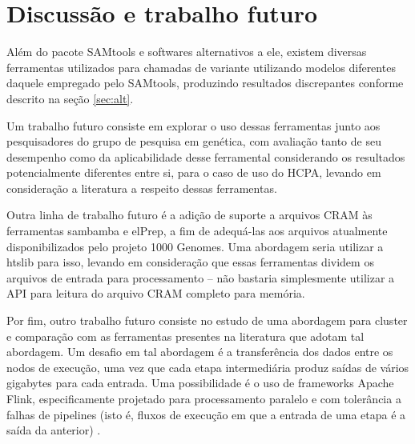 \documentclass[cic,tc]{iiufrgs}
\begin{document}
\section{Discussão e trabalho futuro}

Além do pacote SAMtools e softwares alternativos a ele, existem diversas
ferramentas utilizados para chamadas de variante utilizando modelos diferentes
daquele empregado pelo SAMtools, produzindo resultados discrepantes conforme
descrito na seção \ref{sec:alt}.

Um trabalho futuro consiste em explorar o uso dessas ferramentas junto aos
pesquisadores do grupo de pesquisa em genética, com avaliação tanto de seu
desempenho como da aplicabilidade desse ferramental considerando os resultados
potencialmente diferentes entre si, para o caso de uso do HCPA, levando em
consideração a literatura a respeito dessas ferramentas.

Outra linha de trabalho futuro é a adição de suporte a arquivos CRAM às
ferramentas sambamba e elPrep, a fim de adequá-las aos arquivos atualmente
disponibilizados pelo projeto 1000 Genomes. Uma abordagem seria utilizar a
htslib para isso, levando em consideração que essas ferramentas dividem os
arquivos de entrada para processamento -- não bastaria simplesmente utilizar a
API para leitura do arquivo CRAM completo para memória.

Por fim, outro trabalho futuro consiste no estudo de uma abordagem para cluster
e comparação com as ferramentas presentes na literatura que adotam tal
abordagem. Um desafio em tal abordagem é a transferência dos dados entre os
nodos de execução, uma vez que cada etapa intermediária produz saídas de vários
gigabytes para cada entrada. Uma possibilidade é o uso de frameworks Apache
Flink, especificamente projetado para processamento paralelo e com tolerância a
falhas de pipelines (isto é, fluxos de execução em que a entrada de uma etapa é
a saída da anterior) \cite{carbone2015apache}.

%
%
%
%



\end{document}

